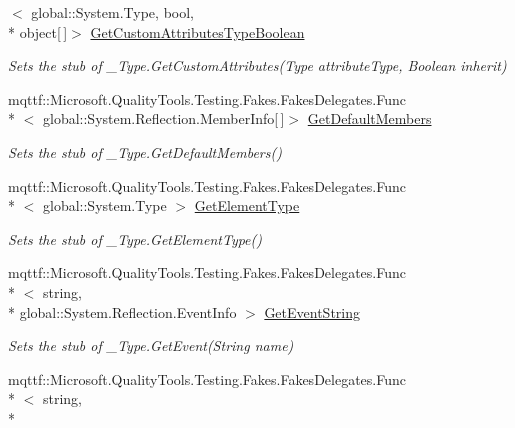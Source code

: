 \begin{DoxyCompactItemize}
$<$ global\-::\-System.\-Type, bool, \\*
object\mbox{[}$\,$\mbox{]}$>$ \hyperlink{class_system_1_1_runtime_1_1_interop_services_1_1_fakes_1_1_stub___type_ab929472be2f240ceda92abd43348cee6}{Get\-Custom\-Attributes\-Type\-Boolean}
\begin{DoxyCompactList}\small\item\em Sets the stub of \-\_\-\-Type.\-Get\-Custom\-Attributes(\-Type attribute\-Type, Boolean inherit)\end{DoxyCompactList}\item 
mqttf\-::\-Microsoft.\-Quality\-Tools.\-Testing.\-Fakes.\-Fakes\-Delegates.\-Func\\*
$<$ global\-::\-System.\-Reflection.\-Member\-Info\mbox{[}$\,$\mbox{]}$>$ \hyperlink{class_system_1_1_runtime_1_1_interop_services_1_1_fakes_1_1_stub___type_ab937a43cfadc9e40a0bf9a4148a8e2c0}{Get\-Default\-Members}
\begin{DoxyCompactList}\small\item\em Sets the stub of \-\_\-\-Type.\-Get\-Default\-Members()\end{DoxyCompactList}\item 
mqttf\-::\-Microsoft.\-Quality\-Tools.\-Testing.\-Fakes.\-Fakes\-Delegates.\-Func\\*
$<$ global\-::\-System.\-Type $>$ \hyperlink{class_system_1_1_runtime_1_1_interop_services_1_1_fakes_1_1_stub___type_a12fe9e89fe74f5a463ce2d8c87540722}{Get\-Element\-Type}
\begin{DoxyCompactList}\small\item\em Sets the stub of \-\_\-\-Type.\-Get\-Element\-Type()\end{DoxyCompactList}\item 
mqttf\-::\-Microsoft.\-Quality\-Tools.\-Testing.\-Fakes.\-Fakes\-Delegates.\-Func\\*
$<$ string, \\*
global\-::\-System.\-Reflection.\-Event\-Info $>$ \hyperlink{class_system_1_1_runtime_1_1_interop_services_1_1_fakes_1_1_stub___type_aa4f8fda88a2f9ebce9e3c8aa3fc8f2a0}{Get\-Event\-String}
\begin{DoxyCompactList}\small\item\em Sets the stub of \-\_\-\-Type.\-Get\-Event(\-String name)\end{DoxyCompactList}\item 
mqttf\-::\-Microsoft.\-Quality\-Tools.\-Testing.\-Fakes.\-Fakes\-Delegates.\-Func\\*
$<$ string, \\*

\end{DoxyCompactItemize}
